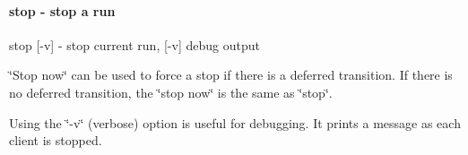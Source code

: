 \label{RC_odbedit_examples_idx_run_stop}
\hypertarget{RC_odbedit_examples_idx_run_stop}{}
 \hypertarget{RC_odbedit_examples_RC_odbedit_stop}{}\paragraph{stop -\/ stop a run}\label{RC_odbedit_examples_RC_odbedit_stop}

\begin{DoxyCode}
stop [-v]               - stop current run, [-v] debug output
\end{DoxyCode}
 \par
 
 \label{RC_odbedit_examples_idx_run_stop_immediately}
\hypertarget{RC_odbedit_examples_idx_run_stop_immediately}{}
 \char`\"{}Stop now\char`\"{} can be used to force a stop if there is a deferred transition. If there is no deferred transition, the \char`\"{}stop now\char`\"{} is the same as \char`\"{}stop\char`\"{}. 
\begin{DoxyCode}
local:bnmr:R]/>stop now
Run #30129 stopped
\end{DoxyCode}
 Using the \char`\"{}-\/v\char`\"{} (verbose) option is useful for debugging. It prints a message as each client is stopped.

\label{RC_odbedit_examples_RC_transition_stop}
\hypertarget{RC_odbedit_examples_RC_transition_stop}{}



